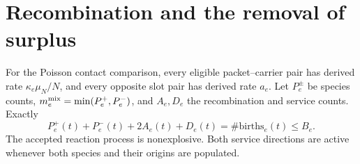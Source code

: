 \documentclass[11pt,oneside,openany]{book}
\theoremstyle{definition}
\theoremstyle{remark}\newtheorem{remark}[theorem]{Remark}
\begin{document}
\section{Recombination and the removal of surplus}
For the Poisson contact comparison, every eligible packet--carrier pair has derived rate $\kappa_e\mu_N/N$, and every opposite slot pair has derived rate $a_e$. Let $P_e^\pm$ be species counts, $m_e^{\rm mix}=\min(P_e^+,P_e^-)$, and $A_e,D_e$ the recombination and service counts. Exactly
\begin{equation}
 P_e^+(t)+P_e^-(t)+2A_e(t)+D_e(t)=\#\mathrm{births}_e(t)\le B_e.
 \label{p:eq-stock}
\end{equation}
The accepted reaction process is nonexplosive. Both service directions are active whenever both species and their origins are populated.
\end{document}
